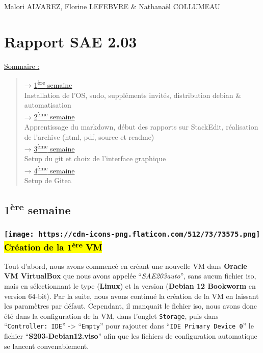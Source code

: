 \documentclass{report}
\begin{document}
Malori ALVAREZ, Florine LEFEBVRE \& Nathanaël COLLUMEAU

\section{Rapport SAE 2.03}\label{rapport-sae-2.03}

\ul{Sommaire :}

\begin{quote}
→ \hyperref[1S]{1\textsuperscript{ère} semaine}\\
Installation de l'OS, sudo, suppléments invités, distribution debian \&
automatisation\\
→ \hyperref[2S]{2\textsuperscript{ème} semaine}\\
Apprentissage du markdown, début des rapports sur StackEdit, réalisation
de l'archive (html, pdf, source et readme)\\
→ \hyperref[3S]{3\textsuperscript{ème} semaine}\\
Setup du git et choix de l'interface graphique\\
→ \hyperref[4S]{4\textsuperscript{ème} semaine}\\
Setup de Gitea\\
\end{quote}

\subsection{\texorpdfstring{1\textsuperscript{ère}
semaine}{1ère semaine}}\label{1S}

\subsubsection[ \hl{Création de la 1\textsuperscript{ère}
VM}]{\texorpdfstring{\protect\texttt{[image: https://cdn-icons-png.flaticon.com/512/73/73575.png]}
\hl{Création de la 1\textsuperscript{ère}
VM}}{drawing Création de la 1ère VM}}\label{drawing-cruxe9ation-de-la-1uxe8re-vm}

Tout d'abord, nous avons commencé en créant une nouvelle VM dans
\textbf{Oracle VM VirtualBox} que nous avons appelée
``\emph{SAE203auto}'', sans aucun fichier iso, mais en sélectionnant le
type (\textbf{Linux}) et la version (\textbf{Debian 12 Bookworm} en
version 64-bit). Par la suite, nous avons continué la création de la VM
en laissant les paramètres par défaut. Cependant, il manquait le fichier
iso, nous avons donc été dans la configuration de la VM, dans l'onglet
\texttt{Storage}, puis dans ``\texttt{Controller:\ IDE}''
-\textgreater{} ``\texttt{Empty}'' pour rajouter dans
``\texttt{IDE\ Primary\ Device\ 0}'' le fichier
``\textbf{S203-Debian12.viso}'' afin que les fichiers de configuration
automatique se lancent convenablement.
\end{document}
